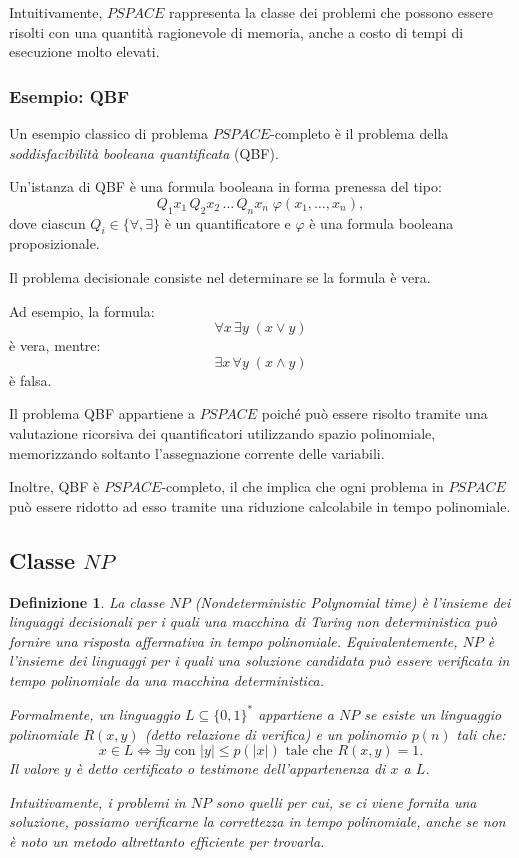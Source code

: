 \documentclass[a4paper,12pt]{report}
\newtheorem{definition}{Definizione}[chapter]
\theoremstyle{propositionstyle}
\begin{document}
    Intuitivamente, $PSPACE$ rappresenta la classe dei problemi che possono essere risolti con una quantità ragionevole di memoria, anche a costo di tempi di esecuzione molto elevati.

    \subsubsection{Esempio: \textsc{QBF}}

    Un esempio classico di problema $PSPACE$-completo è il problema della \emph{soddisfacibilità booleana quantificata} (\textsc{QBF}).

    Un'istanza di \textsc{QBF} è una formula booleana in forma prenessa del tipo:
    \[
        Q_1 x_1 \, Q_2 x_2 \, \dots \, Q_n x_n \; \varphi(x_1, \dots, x_n),
    \]
    dove ciascun $Q_i \in \{\forall, \exists\}$ è un quantificatore e $\varphi$ è una formula booleana proposizionale.

    Il problema decisionale consiste nel determinare se la formula è vera.

    Ad esempio, la formula:
    \[
        \forall x \, \exists y \; (x \lor y)
    \]
    è vera, mentre:
    \[
        \exists x \, \forall y \; (x \land y)
    \]
    è falsa.

    Il problema \textsc{QBF} appartiene a $PSPACE$ poiché può essere risolto tramite una valutazione ricorsiva dei quantificatori utilizzando spazio polinomiale, memorizzando soltanto l'assegnazione corrente delle variabili.

    Inoltre, \textsc{QBF} è $PSPACE$-completo, il che implica che ogni problema in $PSPACE$ può essere ridotto ad esso tramite una riduzione calcolabile in tempo polinomiale.

    \subsection{Classe $NP$}

    \begin{definition}
        La classe $NP$ (Nondeterministic Polynomial time) è l'insieme dei linguaggi decisionali per i quali una macchina di Turing non deterministica può fornire una risposta affermativa in tempo polinomiale.
        Equivalentemente, $NP$ è l'insieme dei linguaggi per i quali una soluzione candidata può essere verificata in tempo polinomiale da una macchina deterministica.

        Formalmente, un linguaggio $L \subseteq \{0,1\}^*$ appartiene a $NP$ se esiste un linguaggio polinomiale $R(x, y)$ (detto \emph{relazione di verifica}) e un polinomio $p(n)$ tali che:
        \[
            x \in L \iff \exists y \text{ con } |y| \leq p(|x|) \text{ tale che } R(x, y) = 1.
        \]
        Il valore $y$ è detto \emph{certificato} o \emph{testimone} dell’appartenenza di $x$ a $L$.

        Intuitivamente, i problemi in $NP$ sono quelli per cui, se ci viene fornita una soluzione, possiamo verificarne la correttezza in tempo polinomiale, anche se non è noto un metodo altrettanto efficiente per trovarla.
    \end{definition}
\end{document}
